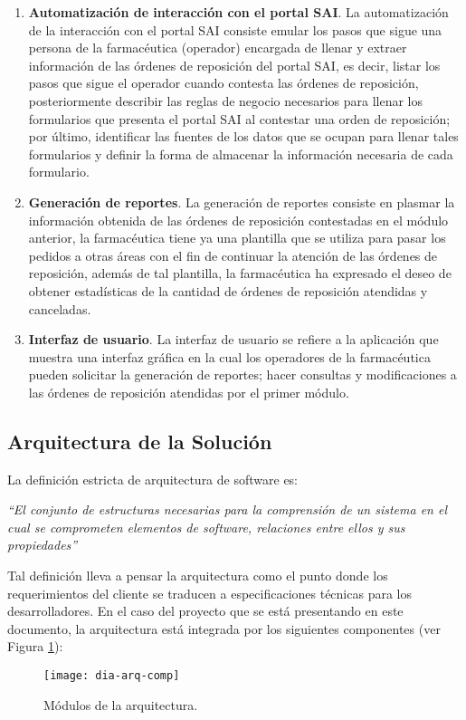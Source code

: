 \begin{enumerate}
\item \textbf{Automatización de interacción con el portal SAI}. La automatización de la interacción con el portal SAI consiste emular los pasos que sigue una persona de la farmacéutica (operador) encargada de llenar y extraer información de las órdenes de reposición del portal SAI, es decir, listar los pasos que sigue el operador cuando contesta las órdenes de reposición, posteriormente describir las reglas de negocio necesarios para llenar los formularios que presenta el portal SAI al contestar una orden de reposición; por último, identificar las fuentes de los datos que se ocupan para llenar tales formularios y definir la forma de almacenar la información necesaria de cada formulario.
\item \textbf{Generación de reportes}. La generación de reportes consiste en plasmar la información obtenida de las órdenes de reposición contestadas en el módulo anterior, la farmacéutica tiene ya una plantilla que se utiliza para pasar los pedidos a otras áreas con el fin de continuar la atención de las órdenes de reposición, además de tal plantilla, la farmacéutica ha expresado el deseo de obtener estadísticas de la cantidad de órdenes de reposición atendidas y canceladas.
\item \textbf{Interfaz de usuario}. La interfaz de usuario se refiere a la aplicación que muestra una interfaz gráfica en la cual los operadores de la farmacéutica pueden solicitar la generación de reportes; hacer consultas y modificaciones a las órdenes de reposición atendidas por el primer módulo.
\end{enumerate}


\subsection{Arquitectura de la Solución}
La definición estricta de arquitectura de software es:
\begin{center}\textit{``El conjunto de estructuras necesarias para la comprensión de un sistema en el cual se comprometen elementos de software, relaciones entre ellos y sus propiedades''}\cite{SWEBOOK}\end{center}
Tal definición lleva a pensar la arquitectura como el punto donde los requerimientos del cliente se traducen a especificaciones técnicas para los desarrolladores. En el caso del proyecto que se está presentando en este documento, la arquitectura está integrada por los siguientes componentes (ver Figura \ref{fig:dia-arq-comp}):
\begin{figure}[h]
\centering
\texttt{[image: dia-arq-comp]} 
\caption{Módulos de la arquitectura.}
\label{fig:dia-arq-comp}
\end{figure}

